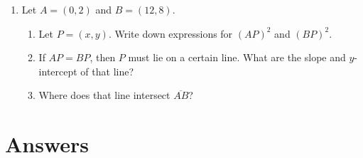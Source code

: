 \documentclass{article}
\begin{document}
\begin{enumerate}
\begin{enumerate}
\end{enumerate}
\item Let $A = (0,2)$ and $B = (12,8)$.
\begin{enumerate}
\item Let $P = (x,y)$. Write down expressions for $(AP)^2$ and $(BP)^2$.
\item If $AP = BP$, then $P$ must lie on a certain line. What are the slope and $y$-intercept of that line?
\item Where does that line intersect $\overline{AB}$?
\end{enumerate}
\end{enumerate}

\newpage
\section{Answers}
\end{document}
